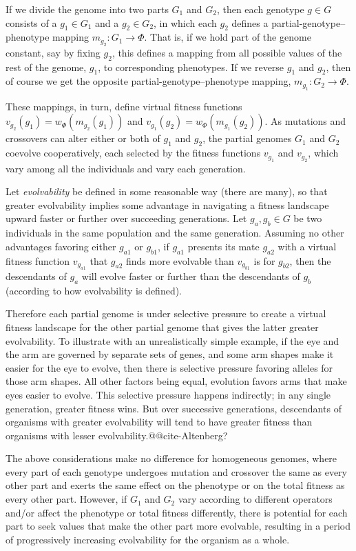 \documentclass[letterpaper]{article}
\begin{document}
If we divide the genome into two parts $G_1$ and $G_2$, then each genotype $g
\in G$ consists of a $g_1 \in G_1$ and a $g_2 \in G_2$, in which each $g_2$
defines a partial-genotype--phenotype mapping $m_{g_2} : G_1 \rightarrow
\Phi$. That is, if we hold part of the genome constant, say by fixing $g_2$,
this defines a mapping from all possible values of the rest of the genome,
$g_1$, to corresponding phenotypes. If we reverse $g_1$ and $g_2$, then of
course we get the opposite partial-genotype--phenotype mapping, $m_{g_1} : G_2
\rightarrow \Phi$.

These mappings, in turn, define virtual fitness functions $v_{g_2}(g_1) =
w_\Phi(m_{g_2}(g_1))$ and $v_{g_1}(g_2) = w_\Phi(m_{g_1}(g_2))$. As mutations
and crossovers can alter either or both of $g_1$ and $g_2$, the partial
genomes $G_1$ and $G_2$ coevolve cooperatively, each selected by
the fitness functions $v_{g_1}$ and $v_{g_2}$, which vary among all the
individuals and vary each generation.

Let \textit{evolvability} be defined in some reasonable way (there are many),
so that greater evolvability implies some advantage in navigating a fitness
landscape upward faster or further over succeeding generations. Let $g_a,g_b
\in G$ be two individuals in the same population and the same generation.
Assuming no other advantages favoring either $g_{a1}$ or $g_{b1}$, if $g_{a1}$
presents its mate $g_{a2}$ with a virtual fitness function $v_{g_{a1}}$ that
$g_{a2}$ finds more evolvable than $v_{g_{b1}}$ is for $g_{b2}$, then the
descendants of $g_a$ will evolve faster or further than the descendants of
$g_b$ (according to how evolvability is defined).

Therefore each partial genome is under selective pressure to create a virtual
fitness landscape for the other partial genome that gives the latter greater
evolvability. To illustrate with an unrealistically simple example, if the eye
and the arm are governed by separate sets of genes, and some arm shapes make
it easier for the eye to evolve, then there is selective pressure favoring
alleles for those arm shapes. All other factors being equal, evolution favors
arms that make eyes easier to evolve. This selective pressure happens
indirectly; in any single generation, greater fitness wins. But over successive
generations, descendants of organisms with greater evolvability will tend to
have greater fitness than organisms with lesser evolvability.@@cite-Altenberg?

The above considerations make no difference for homogeneous genomes, where
every part of each genotype undergoes mutation and crossover the same as every
other part and exerts the same effect on the phenotype or on the total fitness
as every other part. However, if $G_1$ and $G_2$ vary according to different
operators and/or affect the phenotype or total fitness differently, there is
potential for each part to seek values that make the other part more
evolvable, resulting in a period of progressively increasing evolvability for
the organism as a whole.
\end{document}

